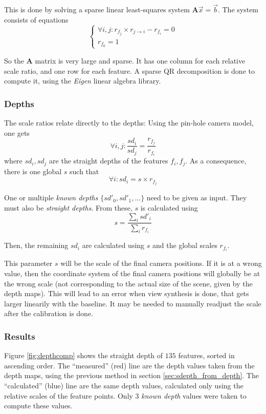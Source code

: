 \documentclass[11pt]{scrreprt}
\newcommand{\matr}[1]{\mathbf{#1}}
\begin{document}
This is done by solving a sparse linear least-squares system $\matr{A} \vec{x} = \vec{b}$. The system consists of equations
\begin{equation*}
\begin{cases}
\forall i,j : r_{f_j} \times r_{j\rightarrow i} - r_{f_i} = 0\\
r_{f_0} = 1
\end{cases}
\end{equation*}

\noindent So the $\matr{A}$ matrix is very large and sparse. It has one column for each relative scale ratio, and one row for each feature. A sparse QR decomposition is done to compute it, using the \emph{Eigen} linear algebra library.


\subsubsection{Depths}
The scale ratios relate directly to the depths: Using the pin-hole camera model, one gets
\begin{equation*}
\forall i,j : \frac{sd_i}{sd_j} = \frac{r_{f_j}}{r_{f_i}}
\end{equation*}
where $sd_i, sd_j$ are the straight depths of the features $f_i, f_j$. As a consequence, there is one global $s$ such that
\begin{equation*}
\forall i : sd_{i} = s \times r_{f_j}
\end{equation*}

\noindent One or multiple \emph{known depths} $\{ sd'_0, sd'_1, ... \}$ need to be given as input. They must also be \emph{straight depths}. From these, $s$ is calculated using 
\begin{equation*}
s = \frac{\sum_{i} sd'_{i}}{\sum_{i} r_{f_i}}
\end{equation*}

\noindent Then, the remaining $sd_i$ are calculated using $s$ and the global scales $r_{f_i}$.

This parameter $s$ will be the scale of the final camera positions. If it is at a wrong value, then the coordinate system of the final camera positions will globally be at the wrong scale (not corresponding to the actual size of the scene, given by the depth maps). This will lead to an error when view synthesis is done, that gets larger linearily with the baseline. It may be needed to manually readjust the scale after the calibration is done.


\subsubsection{Results}
Figure \ref{fig:depthcomp} shows the straight depth of $135$ features, sorted in ascending order. The ``measured'' (red) line are the depth values taken from the depth maps, using the previous method in section \ref{sec:sdepth_from_depth}. The ``calculated'' (blue) line are the same depth values, calculated only using the relative scales of the feature points. Only $3$ \emph{known depth} values were taken to compute these values.
\end{document}
